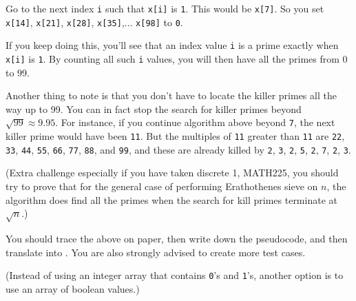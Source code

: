 Go to the next
index \verb!i! such that \verb!x[i]! is \verb!1!.
This would be \verb!x[7]!.
So you set
\verb!x[14]!,
\verb!x[21]!,
\verb!x[28]!,
\verb!x[35]!,...
\verb!x[98]! to \verb!0!.

If you keep doing this, you'll see that
an index value \verb!i! is a prime exactly when
\verb!x[i]! is \verb!1!.
By counting all such \verb!i! values, you will then
have all the primes from 0 to 99.

Another thing to note is that you don't have to
locate the killer primes all the way up to 99.
You can in fact stop the search for killer primes
beyond $\sqrt{99} \approx 9.95$.
For instance, if you continue algorithm above beyond \verb!7!,
the next killer prime would have been \verb!11!.
But the multiples of \verb!11! greater than \verb!11!
are
\verb!22!,
\verb!33!,
\verb!44!,
\verb!55!,
\verb!66!,
\verb!77!,
\verb!88!, and
\verb!99!,
and these are already killed by
\verb!2!,
\verb!3!,
\verb!2!,
\verb!5!,
\verb!2!,
\verb!7!,
\verb!2!,
\verb!3!.

(Extra challenge especially if you have taken discrete 1, MATH225,
you should try to prove
that for the general case of performing Erathothenes sieve on $n$,
the algorithm does find all the primes when the search for kill primes
terminate at $\sqrt{n}$.)

You should trace the above on paper, then write down the pseudocode,
and then translate into \cpp.
You are also strongly advised to create more test cases.

(Instead of using an integer array that contains
\verb!0!'s
and
\verb!1!'s,
another option is to use
an array of boolean values.)
